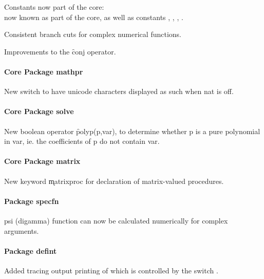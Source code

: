 Constants now part of the core:\\
 now known as part of the
core, as well as constants , , ,
.

Consistent branch cuts for complex numerical functions.

Improvements to the \f{conj} operator.

\paragraph*{Core Package mathpr}

New switch  to have unicode characters
displayed as such when nat is off.

\paragraph*{Core Package solve}

New boolean operator \f{polyp}(p,var), to determine whether p is a pure polynomial
in var, ie. the coefficients of p do not contain var.

\paragraph*{Core Package matrix}

New keyword \k{matrixproc} for declaration of matrix-valued procedures.

\paragraph{Package specfn}

psi (digamma) function can now be calculated numerically for complex arguments.

\paragraph{Package defint}

Added tracing output printing of which is controlled by the switch .
